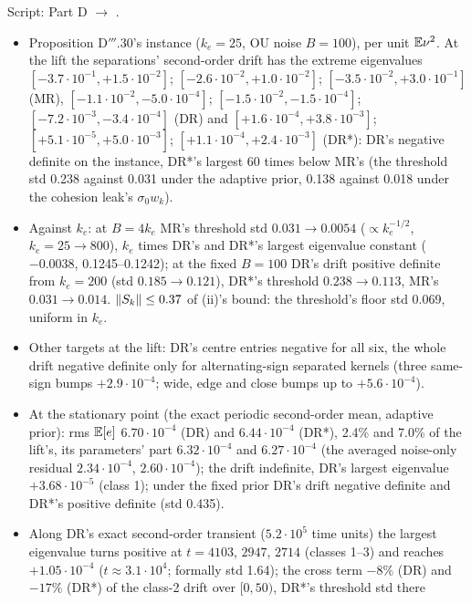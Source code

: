 Script:  Part D $\to$ .
\begin{itemize}
  \item Proposition D$'''$.30's instance ($k_e=25$, OU noise $B=100$), per unit $\mathbb{E}\nu^2$. At the lift the
    separations' second-order drift has the extreme eigenvalues $[-3.7\cdot10^{-1},+1.5\cdot10^{-2}]$;
    $[-2.6\cdot10^{-2},+1.0\cdot10^{-2}]$; $[-3.5\cdot10^{-2},+3.0\cdot10^{-1}]$ (MR),
    $[-1.1\cdot10^{-2},-5.0\cdot10^{-4}]$; $[-1.5\cdot10^{-2},-1.5\cdot10^{-4}]$; $[-7.2\cdot10^{-3},-3.4\cdot10^{-4}]$
    (DR) and $[+1.6\cdot10^{-4},+3.8\cdot10^{-3}]$; $[+5.1\cdot10^{-5},+5.0\cdot10^{-3}]$;
    $[+1.1\cdot10^{-4},+2.4\cdot10^{-3}]$ (DR*): DR's negative definite on the instance, DR*'s largest 60 times below
    MR's (the threshold std 0.238 against 0.031 under the adaptive prior, 0.138 against 0.018 under the cohesion
    leak's $\sigma_0w_k$).
  \item Against $k_e$: at $B=4k_e$ MR's threshold std $0.031\to0.0054$ ($\propto k_e^{-1/2}$, $k_e=25\to800$), $k_e$
    times DR's and DR*'s largest eigenvalue constant ($-0.0038$, 0.1245--0.1242); at the fixed $B=100$ DR's drift
    positive definite from $k_e=200$ (std $0.185\to0.121$), DR*'s threshold $0.238\to0.113$, MR's $0.031\to0.014$.
    $\lVert S_k\rVert\le0.37$ of (ii)'s bound: the threshold's floor std 0.069, uniform in $k_e$.
  \item Other targets at the lift: DR's centre entries negative for all six, the whole drift negative definite only
    for alternating-sign separated kernels (three same-sign bumps $+2.9\cdot10^{-4}$; wide, edge and close bumps up to
    $+5.6\cdot10^{-4}$).
  \item At the stationary point (the exact periodic second-order mean, adaptive prior): rms $\mathbb{E}[e]$ $6.70\cdot10^{-4}$
    (DR) and $6.44\cdot10^{-4}$ (DR*), 2.4\% and 7.0\% of the lift's, its parameters' part $6.32\cdot10^{-4}$ and
    $6.27\cdot10^{-4}$ (the averaged noise-only residual $2.34\cdot10^{-4}$, $2.60\cdot10^{-4}$); the drift
    indefinite, DR's largest eigenvalue $+3.68\cdot10^{-5}$ (class 1); under the fixed prior DR's drift negative
    definite and DR*'s positive definite (std 0.435).
  \item Along DR's exact second-order transient ($5.2\cdot10^5$ time units) the largest eigenvalue turns positive at
    $t=4103$, $2947$, $2714$ (classes 1--3) and reaches $+1.05\cdot10^{-4}$ ($t\approx3.1\cdot10^4$; formally std
    1.64); the cross term $-8\%$ (DR) and $-17\%$ (DR*) of the class-2 drift over $[0,50)$, DR*'s threshold std there

\end{itemize}
